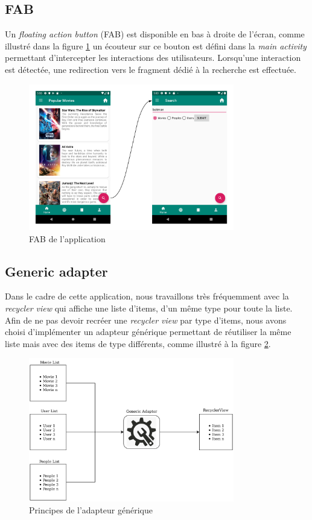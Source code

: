 \subsection{FAB}
Un \textit{floating action button} (FAB) est disponible en bas à droite de l'écran, comme illustré dans la figure \ref{fab} un écouteur sur ce bouton est défini dans la \textit{main activity} permettant d'intercepter les interactions des utilisateurs. Lorsqu'une interaction est détectée, une redirection vers le fragment dédié à la recherche est effectuée.
\begin{figure}
    \begin{center}
        \includegraphics[width=0.8\textwidth]{img/screenshots/FAB.png}
    \end{center}
    \caption{FAB de l'application}
    \label{fab}
\end{figure}

\subsection{Generic adapter}\label{generic-adapter}
Dans le cadre de cette application, nous travaillons très fréquemment avec la \textit{recycler view} qui affiche une liste d'items, d'un même type pour toute la liste. Afin de ne pas devoir recréer une \textit{recycler view} par type d'items, nous avons choisi d'implémenter un adapteur générique permettant de réutiliser la même liste mais avec des items de type différents, comme illustré à la figure \ref{generic_adapter_img}.
\begin{figure}
    \begin{center}
        \includegraphics[width=0.8\textwidth]{img/schemas/Generic_Adapter.png}
    \end{center}
    \caption{Principes de l'adapteur générique}
    \label{generic_adapter_img}
\end{figure}
